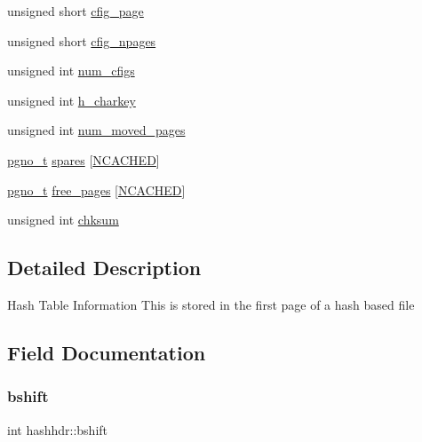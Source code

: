 \begin{DoxyCompactItemize}
\item 
unsigned short \mbox{\hyperlink{structhashhdr_a1ae40392d2750ee0cace86c6489b46f4}{cfig\+\_\+page}}
\item 
unsigned short \mbox{\hyperlink{structhashhdr_aec73ec8707c3938d6999f05984130476}{cfig\+\_\+npages}}
\item 
unsigned int \mbox{\hyperlink{structhashhdr_a05c33143f9e8aada42858930fb8058f0}{num\+\_\+cfigs}}
\item 
unsigned int \mbox{\hyperlink{structhashhdr_a5af866b3ffa5d9130692987e0d1d6439}{h\+\_\+charkey}}
\item 
unsigned int \mbox{\hyperlink{structhashhdr_ac50a7cbc7fe8275da82199536384d71d}{num\+\_\+moved\+\_\+pages}}
\item 
\mbox{\hyperlink{other__libs_2filedb_2filehash_2ffdb__db_8h_a000813331643d38481142bcce7de1501}{pgno\+\_\+t}} \mbox{\hyperlink{structhashhdr_ae9bfd1813078fd2c860b90659e317c10}{spares}} \mbox{[}\mbox{\hyperlink{ffdb__hash_8h_a2a0096aff8f4e93a03a33f31917b4067}{N\+C\+A\+C\+H\+ED}}\mbox{]}
\item 
\mbox{\hyperlink{other__libs_2filedb_2filehash_2ffdb__db_8h_a000813331643d38481142bcce7de1501}{pgno\+\_\+t}} \mbox{\hyperlink{structhashhdr_a38a1ac0b707e43ac445253101f0f510b}{free\+\_\+pages}} \mbox{[}\mbox{\hyperlink{ffdb__hash_8h_a2a0096aff8f4e93a03a33f31917b4067}{N\+C\+A\+C\+H\+ED}}\mbox{]}
\item 
unsigned int \mbox{\hyperlink{structhashhdr_aeaff041fc98272420df85480992eee08}{chksum}}
\end{DoxyCompactItemize}


\subsection{Detailed Description}
Hash Table Information This is stored in the first page of a hash based file 

\subsection{Field Documentation}
\mbox{\label{structhashhdr_a0f659452a041702880751164a032c46b}} 
\subsubsection{\texorpdfstring{bshift}{bshift}}
{\footnotesize\ttfamily int hashhdr\+::bshift}

